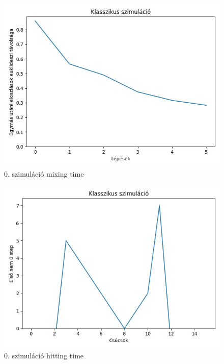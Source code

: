 \documentclass[14pt,a4paper]{article}
\begin{document}
\begin{figure}[H]
\centering
\includegraphics[width = 0.7\columnwidth]{sim_00/mixing_time.jpg}
\caption{0. szimuláció mixing time}
\end{figure}
\begin{figure}[H]
\centering
\includegraphics[width = 0.7\columnwidth]{sim_00/hitting_time.jpg}
\caption{0. szimuláció hitting time}
\end{figure}
\end{document}
